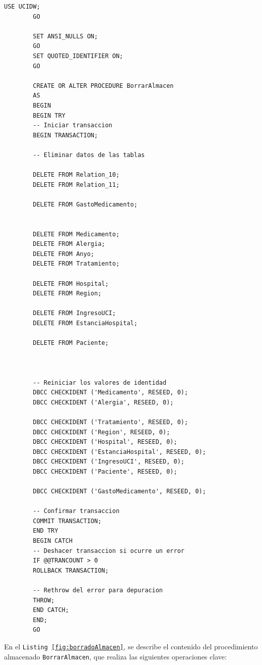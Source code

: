 \documentclass{article}
\begin{document}
	\begin{lstlisting}[style=ddlstyle, label=fig:borradoAlmacen,caption=Borrado del Almacen de UCI]
		USE UCIDW;
		GO
		
		SET ANSI_NULLS ON;
		GO
		SET QUOTED_IDENTIFIER ON;
		GO
		
		CREATE OR ALTER PROCEDURE BorrarAlmacen	
		AS
		BEGIN
		BEGIN TRY
		-- Iniciar transaccion
		BEGIN TRANSACTION;
		
		-- Eliminar datos de las tablas
		
		DELETE FROM Relation_10;
		DELETE FROM Relation_11;
		
		DELETE FROM GastoMedicamento;
		
		
		DELETE FROM Medicamento;
		DELETE FROM Alergia;
		DELETE FROM Anyo;
		DELETE FROM Tratamiento;
		
		DELETE FROM Hospital;
		DELETE FROM Region;
		
		DELETE FROM IngresoUCI;
		DELETE FROM EstanciaHospital;
		
		DELETE FROM Paciente;
		
		
		
		-- Reiniciar los valores de identidad
		DBCC CHECKIDENT ('Medicamento', RESEED, 0);
		DBCC CHECKIDENT ('Alergia', RESEED, 0);
		
		DBCC CHECKIDENT ('Tratamiento', RESEED, 0);
		DBCC CHECKIDENT ('Region', RESEED, 0);
		DBCC CHECKIDENT ('Hospital', RESEED, 0);
		DBCC CHECKIDENT ('EstanciaHospital', RESEED, 0);
		DBCC CHECKIDENT ('IngresoUCI', RESEED, 0);
		DBCC CHECKIDENT ('Paciente', RESEED, 0);
		
		DBCC CHECKIDENT ('GastoMedicamento', RESEED, 0);
		
		-- Confirmar transaccion
		COMMIT TRANSACTION;
		END TRY
		BEGIN CATCH
		-- Deshacer transaccion si ocurre un error
		IF @@TRANCOUNT > 0
		ROLLBACK TRANSACTION;
		
		-- Rethrow del error para depuracion
		THROW;
		END CATCH;
		END;
		GO
	\end{lstlisting}
	
	
	En el \texttt{Listing \ref{fig:borradoAlmacen}}, se describe el contenido del procedimiento almacenado \texttt{BorrarAlmacen}, que realiza las siguientes operaciones clave:
	
\end{document}
